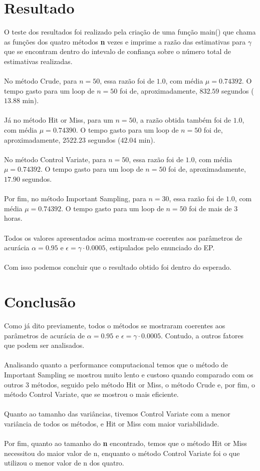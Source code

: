 \documentclass{article}
\begin{document}
\section{Resultado}

O teste dos resultados foi realizado pela criação de uma função main() que chama as funções dos quatro métodos \textbf{n} vezes e imprime a razão das estimativas para $\gamma$ que se encontram dentro do intevalo de confiança sobre o número total de estimativas realizadas.\\
\\
No método Crude, para $n = 50$, essa razão foi de $1.0$, com média $\mu = 0.74392$. O tempo gasto para um loop de $n = 50$ foi de, aproximadamente, $832.59$ segundos ($13.88$ min).\\
\\
Já no método Hit or Miss, para um $n = 50$, a razão obtida também foi de $1.0$, com média $\mu = 0.74390$. O tempo gasto para um loop de $n = 50$ foi de, aproximadamente, $2522.23$ segundos ($42.04$ min).\\
\\
No método Control Variate, para $n = 50$, essa razão foi de $1.0$, com média $\mu = 0.74392$. O tempo gasto para um loop de $n = 50$ foi de, aproximadamente, $17.90$ segundos.\\
\\
Por fim, no método Important Sampling, para $n = 30$, essa razão foi de $1.0$, com média $\mu = 0.74392$. O tempo gasto para um loop de $n = 50$ foi de mais de 3 horas.\\
\\
Todos os valores apresentados acima mostram-se coerentes aos parâmetros de acurácia $\alpha = 0.95$ e $\epsilon = \gamma \cdot0.0005$, estipulados pelo enunciado do EP. \\
\\
Com isso podemos concluir que o resultado obtido foi dentro do esperado.

\section{Conclusão}

Como já dito previamente, todos o métodos se mostraram coerentes aos parâmetros de acurácia de $\alpha = 0.95$ e $\epsilon = \gamma \cdot0.0005$. Contudo, a outros fatores que podem ser analisados.\\
\\
Analisando quanto a performance computacional temos que o método de Important Sampling se mostrou muito lento e custoso quando comparado com os outros 3 métodos, seguido pelo método Hit or Miss, o método Crude e, por fim, o método Control Variate, que se mostrou o mais eficiente.\\
\\
Quanto ao tamanho das variâncias, tivemos Control Variate com a menor variância de todos os métodos, e Hit or Miss com maior variabilidade.\\
\\
Por fim, quanto ao tamanho do \textbf{n} encontrado, temos que o método Hit or Miss necessitou do maior valor de n, enquanto o método Control Variate  foi o que utilizou o menor valor de n dos quatro.
\end{document}
